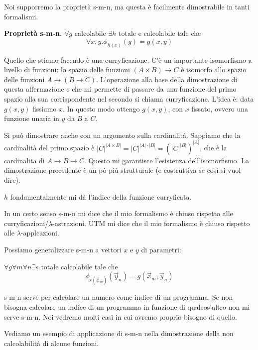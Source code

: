 Noi supporremo la proprietà s-m-n, ma questa è facilmente dimostrabile in tanti formalismi.
\begin{thm}
    \textbf{Proprietà s-m-n. } $\forall g$ calcolabile $\exists h$ totale e calcolabile tale che
    \begin{equation*}
        \forall x,y. \phi_{h(x)}(y) = g(x,y)
    \end{equation*}
\end{thm}

Quello che stiamo facendo è una curryficazione. C'è un importante isomorfismo a livello di funzioni:
lo spazio delle funzioni $(A \times B) \to C$ è isomorfo allo spazio delle funzioni $A \to (B \to
C)$. L'operazione alla base della dimostrazione di questa affermazione e che mi permette di passare
da una funzione del primo spazio alla sua corrispondente nel secondo si chiama curryficazione.
L'idea è: data $g(x,y)$ fissiamo $x$. In questo modo ottengo $g(x,y)$, con $x$ fissato, ovvero una funzione
unaria in $y$ da $B$ a $C$.

Si può dimostrare anche con un argomento sulla cardinalità. Sappiamo che la cardinalità del primo
spazio è $|C|^{|A \times B|} = |C|^{|A|\cdot|B|} = (|C|^{|B|})^{|A|}$, che è la cardinalita di $A
\to B \to C$. Questo mi garantisce l'esistenza dell'isomorfismo. La dimostrazione precedente è un pò
più strutturale (e costruttiva se così si vuol dire).

$h$ fondamentalmente mi dà l'indice della funzione curryficata.

In un certo senso s-m-n mi dice che il mio formalismo è chiuso rispetto alle
curryficazioni/$\lambda$-astrazioni. UTM mi dice che il mio formalismo è chiuso rispetto alle
$\lambda$-applcazioni.

Possiamo generalizzare s-m-n a vettori $x$ e $y$ di parametri: 
\begin{thm}
    $\forall g \forall m \forall n \exists s$ totale calcolabile tale che
    \begin{equation*}
        \phi_{s(\vec{x}_{m})}(\vec{y}_{n}) = g(\vec{x}_{m},\vec{y}_{n})
    \end{equation*}
\end{thm}

s-m-n serve per calcolare un numero come indice di un programma. Se non bisogna calcolare un indice
di un programma in funzione di qualcos'altro non mi serve s-m-n. Noi vedremo molti casi in cui
avremo proprio bisogno di quello.

Vediamo un esempio di applicazione di s-m-n nella dimostrazione della non calcolabilità di alcune
funzioni.

